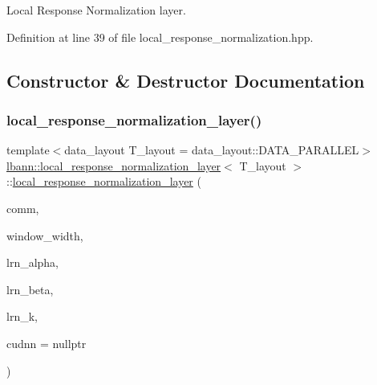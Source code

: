 Local Response Normalization layer. 

Definition at line 39 of file local\+\_\+response\+\_\+normalization.\+hpp.



\subsection{Constructor \& Destructor Documentation}
\mbox{\label{classlbann_1_1local__response__normalization__layer_a5fa2f3175590cc85aa984c42cc9acd95}} 
\subsubsection{\texorpdfstring{local\+\_\+response\+\_\+normalization\+\_\+layer()}{local\_response\_normalization\_layer()}\hspace{0.1cm}{\footnotesize\ttfamily [1/2]}}
{\footnotesize\ttfamily template$<$data\+\_\+layout T\+\_\+layout = data\+\_\+layout\+::\+D\+A\+T\+A\+\_\+\+P\+A\+R\+A\+L\+L\+EL$>$ \\
\hyperlink{classlbann_1_1local__response__normalization__layer}{lbann\+::local\+\_\+response\+\_\+normalization\+\_\+layer}$<$ T\+\_\+layout $>$\+::\hyperlink{classlbann_1_1local__response__normalization__layer}{local\+\_\+response\+\_\+normalization\+\_\+layer} (\begin{DoxyParamCaption}\item[{\hyperlink{classlbann_1_1lbann__comm}{lbann\+\_\+comm} $\ast$}]{comm,  }\item[{int}]{window\+\_\+width,  }\item[{Data\+Type}]{lrn\+\_\+alpha,  }\item[{Data\+Type}]{lrn\+\_\+beta,  }\item[{Data\+Type}]{lrn\+\_\+k,  }\item[{\hyperlink{classlbann_1_1cudnn_1_1cudnn__manager}{cudnn\+::cudnn\+\_\+manager} $\ast$}]{cudnn = {\ttfamily nullptr} }\end{DoxyParamCaption})\hspace{0.3cm}{\ttfamily [inline]}}



